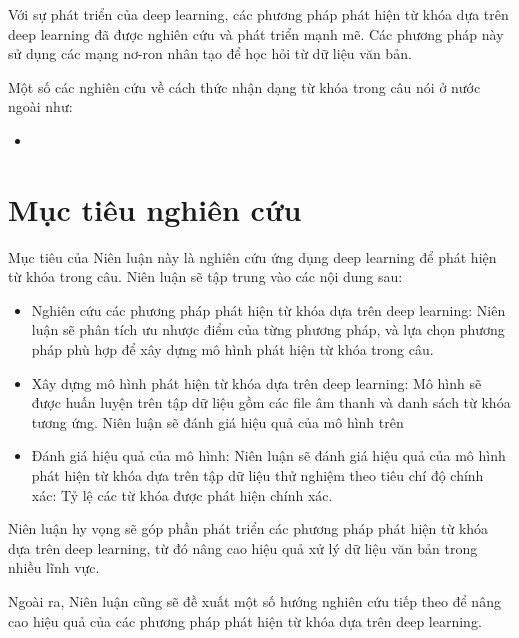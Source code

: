 Với sự phát triển của deep learning, các phương pháp phát hiện từ khóa dựa trên deep learning đã được nghiên cứu và phát triển mạnh mẽ. Các phương pháp này sử dụng các mạng nơ-ron nhân tạo để học hỏi từ dữ liệu văn bản.

Một số các nghiên cứu về cách thức nhận dạng từ khóa trong câu nói ở nước ngoài như: 
\begin{itemize}
    \item 
\end{itemize}

\section{Mục tiêu nghiên cứu}

Mục tiêu của Niên luận này là nghiên cứu ứng dụng deep learning để phát hiện từ khóa trong câu. Niên luận sẽ tập trung vào các nội dung sau:
\begin{itemize}

    \item Nghiên cứu các phương pháp phát hiện từ khóa dựa trên deep learning: Niên luận sẽ phân tích ưu nhược điểm của từng phương pháp, và lựa chọn phương pháp phù hợp để xây dựng mô hình phát hiện từ khóa trong câu.

    \item Xây dựng mô hình phát hiện từ khóa dựa trên deep learning: Mô hình sẽ được huấn luyện trên tập dữ liệu gồm các file âm thanh và danh sách từ khóa tương ứng. Niên luận sẽ đánh giá hiệu quả của mô hình trên 

    \item Đánh giá hiệu quả của mô hình: Niên luận sẽ đánh giá hiệu quả của mô hình phát hiện từ khóa dựa trên tập dữ liệu thử nghiệm theo tiêu chí độ chính xác: Tỷ lệ các từ khóa được phát hiện chính xác.
\end{itemize}

Niên luận hy vọng sẽ góp phần phát triển các phương pháp phát hiện từ khóa dựa trên deep learning, từ đó nâng cao hiệu quả xử lý dữ liệu văn bản trong nhiều lĩnh vực.

Ngoài ra, Niên luận cũng sẽ đề xuất một số hướng nghiên cứu tiếp theo để nâng cao hiệu quả của các phương pháp phát hiện từ khóa dựa trên deep learning.
